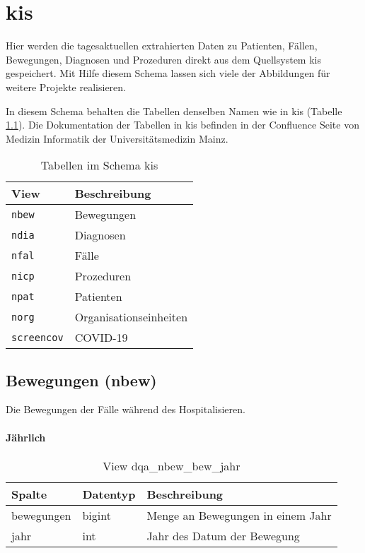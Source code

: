 \chapter{\acs{kis}} \label{chp:kis}

Hier werden die tagesaktuellen extrahierten Daten zu Patienten, Fällen, Bewegungen, Diagnosen und Prozeduren direkt aus dem Quellsystem \ac{kis} gespeichert. Mit Hilfe diesem Schema lassen sich viele der Abbildungen für weitere Projekte realisieren.

In diesem Schema behalten die Tabellen denselben Namen wie in \ac{kis} (Tabelle \ref{tab:schemaKis}). Die Dokumentation der Tabellen in \ac{kis} befinden in der Confluence Seite von Medizin Informatik der Universitätsmedizin Mainz.

\begin{table}[ht]
	\centering   
	\caption{Tabellen im Schema \acs{kis}}
	\label{tab:schemaKis}
	\begin{tabular}{||l|l||}   		
		\hline
		View & Beschreibung \\ [0.5ex]
		\hline\hline
		\texttt{nbew} & Bewegungen \\
		\hline
		\texttt{ndia} & Diagnosen \\
		\hline
		\texttt{nfal} & Fälle \\
		\hline
		\texttt{nicp} & Prozeduren \\
		\hline
		\texttt{npat} & Patienten \\
		\hline
		\texttt{norg} & Organisationseinheiten \\
		\hline
		\texttt{screencov} & COVID-19 \\
		\hline
	\end{tabular}
\end{table}

\section{Bewegungen (nbew)} \label{sec:beweg}

Die Bewegungen der Fälle während des Hospitalisieren.

\subsubsection{Jährlich} \label{subsubsec:bewJahr}

\clearpage

\begin{table}[ht]
	\centering   
	\caption{View dqa\_nbew\_bew\_jahr}
	\label{tab:beweJahr}
	\begin{tabular}{||l|l|p{10cm}||}   		
		\hline
		Spalte & Datentyp & Beschreibung \\ [0.5ex]
		\hline\hline
		bewegungen & bigint & Menge an Bewegungen in einem Jahr\\
		\hline
		jahr & int &  Jahr des Datum der Bewegung \\
		\hline
		
	\end{tabular}
\end{table}


